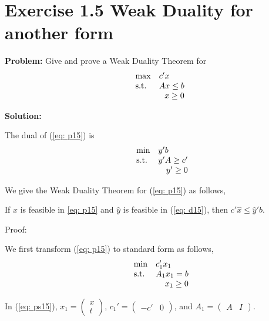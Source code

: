 \section{Exercise 1.5 Weak Duality for another form}
\textbf{Problem:} Give and prove a Weak Duality Theorem for 
\begin{equation}
\label{eq: p15}
  \begin{array}{lrcll}
    \max 
    & \multicolumn{4}{l}{c'x} \\
    \text{s.t.}
    & Ax\leq b \\
    & x \geq 0
  \end{array}
\end{equation}

\textbf{Solution:}

The dual of (\ref{eq: p15}) is 
\begin{equation}
\label{eq: d15}
  \begin{array}{lrcll}
    \min
    & \multicolumn{4}{l}{y'b} \\
    \text{s.t.}
    & y'A\geq c' \\
    & y' \geq 0
  \end{array}
\end{equation}

We give the Weak Duality Theorem for (\ref{eq: p15}) as follows,
\begin{thm}
If $\widehat{x}$ is feasible in \ref{eq: p15} and $\widehat{y}$ is feasible in (\ref{eq: d15}), then $c'\widehat{x}\leq \widehat{y}'b$.
\end{thm}

Proof:

We first transform (\ref{eq: p15}) to standard form as follows,
\begin{equation}
\label{eq: ps15}
  \begin{array}{lrcll}
    \min
    & \multicolumn{4}{l}{c_{1}'x_{1}} \\
    \text{s.t.}
    & A_{1}x_{1}= b \\
    & x_{1} \geq 0
  \end{array}
\end{equation}

In (\ref{eq: ps15}), $x_{1}=  \left( \begin{array}{c} x \\ t \end{array}\right) $,  $c_{1}'= \left( \begin{array}{cc} -c' & 0 \end{array}\right) $, and $A_{1} = \left( \begin{array}{cc} A & I \end{array}\right)$.

